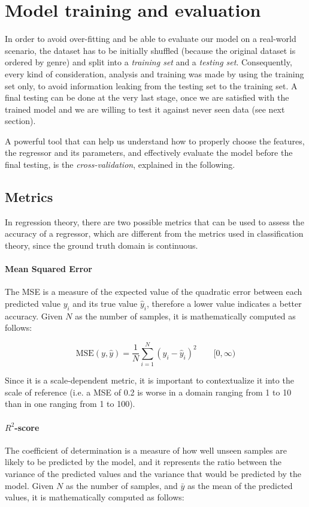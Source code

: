 \section{Model training and evaluation}\label{sec:evaluation}

In order to avoid over-fitting and be able to evaluate our model on a real-world scenario, the dataset has to be initially shuffled (because the original dataset is ordered by genre) and split into a \emph{training set} and a \emph{testing set}.
Consequently, every kind of consideration, analysis and training was made by using the training set only, to avoid information leaking from the testing set to the training set.
A final testing can be done at the very last stage, once we are satisfied with the trained model and we are willing to test it against never seen data (see next section).

A powerful tool that can help us understand how to properly choose the features, the regressor and its parameters, and effectively evaluate the model before the final testing, is the \emph{cross-validation}, explained in the following.

\subsection{Metrics}\label{sec:metrics}

In regression theory, there are two possible metrics that can be used to assess the accuracy of a regressor, which are different from the metrics used in classification theory, since the ground truth domain is continuous.

\paragraph{Mean Squared Error}
The MSE is a measure of the expected value of the quadratic error between each predicted value $y_i$ and its true value $\hat{y}_i$, therefore a lower value indicates a better accuracy.
Given $N$ as the number of samples, it is mathematically computed as follows:

\[
	\text{MSE}(y, \hat{y}) = \frac{1}{N} \sum_{i=1}^{N} (y_i - \hat{y}_i)^2
	\qquad [0, \infty)
\]

Since it is a scale-dependent metric, it is important to contextualize it into the scale of reference (i.e. a MSE of 0.2 is worse in a domain ranging from 1 to 10 than in one ranging from 1 to 100).

\paragraph{$R^2$-score}
The coefficient of determination is a measure of how well unseen samples are likely to be predicted by the model, and it represents the ratio between the variance of the predicted values and the variance that would be predicted by the model.
Given $N$ as the number of samples, and $\bar{y}$ as the mean of the predicted values, it is mathematically computed as follows:

